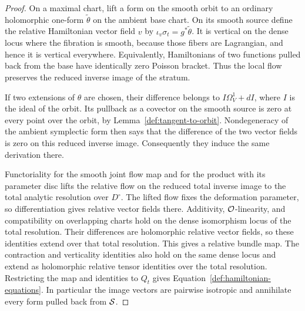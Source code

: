 \begin{proof}
On a maximal chart, lift a form on the smooth orbit to an ordinary
holomorphic one-form $\widetilde\theta$ on the ambient base chart.
On its smooth source define the relative Hamiltonian vector field
$v$ by
$\iota_v\sigma_t=g^*\widetilde\theta$.
It is vertical on the dense locus where the fibration is smooth,
because those fibers are Lagrangian, and hence it is vertical
everywhere.  Equivalently, Hamiltonians of two functions pulled
back from the base have identically zero Poisson bracket.
Thus the local flow preserves the reduced inverse image of the
stratum.

If two extensions of $\theta$ are chosen, their difference belongs
to $I\Omega^1_V+dI$, where $I$ is the ideal of the orbit.
Its pullback as a covector on the smooth source is zero at every
point over the orbit, by Lemma~\ref{def:tangent-to-orbit}.
Nondegeneracy of the ambient symplectic form then says that the
difference of the two vector fields is zero on this reduced inverse
image.  Consequently they induce the same derivation there.

Functoriality for the smooth joint flow map and for the product with
its parameter disc lifts the relative flow on the reduced total inverse
image to the total analytic resolution over $D^\circ$.  The lifted
flow fixes the deformation parameter, so differentiation gives relative
vector fields there.  Additivity, $\mathcal O$-linearity, and
compatibility on overlapping charts hold on the dense isomorphism
locus of the total resolution.  Their differences are holomorphic
relative vector fields, so these identities extend over that total
resolution.  This gives a relative bundle map.  The contraction and
verticality identities also hold on the same dense locus and extend
as holomorphic relative tensor identities over the total resolution.
Restricting the map and identities to $Q_t$ gives
Equation~\eqref{def:hamiltonian-equations}.  In particular the image
vectors are pairwise isotropic and annihilate every form pulled back
from $\mathcal S$.
\end{proof}

